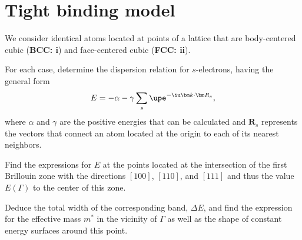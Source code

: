 
\section{Tight binding model}

\begin{problem}
  We consider identical atoms located at points of a lattice that are
  body-centered cubic (\textbf{BCC: i}) and face-centered cubic
  (\textbf{FCC: ii}).
  \begin{enumext}
    \item For each case, determine the dispersion relation for $s$-electrons,
    having the general form
    \[
      E = -\alpha - \gamma \sum_s \upe^{-\iu \bm k \cdot \bm R_s},
    \]
    where $\alpha$ and $\gamma$ are the positive energies that can be calculated
    and $\mathbf R_s$ represents the vectors that connect an atom located at the
    origin to each of its nearest neighbors.
    \item Find the expressions for $E$ at the points located at the intersection
    of the first Brillouin zone with the directions $[100]$, $[110]$,
    and $[111]$ and thus the value $E(\Gamma)$ to the center of this zone.
    \item Deduce the total width of the corresponding band, $\Delta E$, and find
    the expression for the effective mass $m^*$ in the vicinity of $\Gamma$ as
    well as the shape of constant energy surfaces around this point.
  \end{enumext}
\end{problem}

